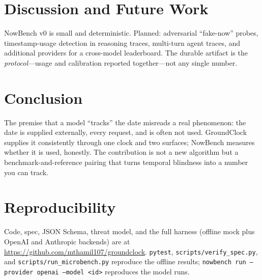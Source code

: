 \documentclass[11pt]{article}
\begin{document}
\section{Discussion and Future Work}
NowBench v0 is small and deterministic. Planned: adversarial ``fake-now'' probes, timestamp-usage
detection in reasoning traces, multi-turn agent traces, and additional providers for a cross-model
leaderboard. The durable artifact is the \emph{protocol}---usage and calibration reported
together---not any single number.

\section{Conclusion}
The premise that a model ``tracks'' the date misreads a real phenomenon: the date is supplied
externally, every request, and is often not used. GroundClock supplies it consistently through one
clock and two surfaces; NowBench measures whether it is used, honestly. The contribution is not a
new algorithm but a benchmark-and-reference pairing that turns temporal blindness into a number you
can track.

\section*{Reproducibility}
Code, spec, JSON Schema, threat model, and the full harness (offline mock plus OpenAI and Anthropic
backends) are at \url{https://github.com/mthamil107/groundclock}. \texttt{pytest},
\texttt{scripts/verify\_spec.py}, and \texttt{scripts/run\_microbench.py} reproduce the offline
results; \texttt{nowbench run --provider openai --model <id>} reproduces the model runs.



\end{document}
